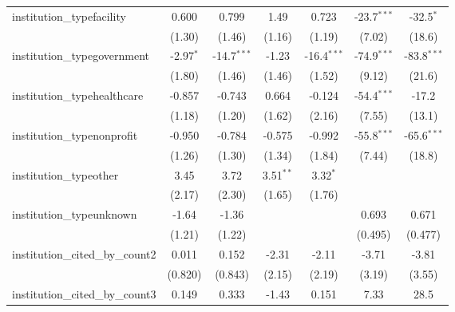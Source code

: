 \begin{tabular}{lcccccc}
   institution\_typefacility             & 0.600         & 0.799         & 1.49          & 0.723         & -23.7$^{***}$ & -32.5$^{*}$\\   
                                         & (1.30)        & (1.46)        & (1.16)        & (1.19)        & (7.02)        & (18.6)\\   
   institution\_typegovernment           & -2.97$^{*}$   & -14.7$^{***}$ & -1.23         & -16.4$^{***}$ & -74.9$^{***}$ & -83.8$^{***}$\\   
                                         & (1.80)        & (1.46)        & (1.46)        & (1.52)        & (9.12)        & (21.6)\\   
   institution\_typehealthcare           & -0.857        & -0.743        & 0.664         & -0.124        & -54.4$^{***}$ & -17.2\\   
                                         & (1.18)        & (1.20)        & (1.62)        & (2.16)        & (7.55)        & (13.1)\\   
   institution\_typenonprofit            & -0.950        & -0.784        & -0.575        & -0.992        & -55.8$^{***}$ & -65.6$^{***}$\\   
                                         & (1.26)        & (1.30)        & (1.34)        & (1.84)        & (7.44)        & (18.8)\\   
   institution\_typeother                & 3.45          & 3.72          & 3.51$^{**}$   & 3.32$^{*}$    &               &   \\   
                                         & (2.17)        & (2.30)        & (1.65)        & (1.76)        &               &   \\   
   institution\_typeunknown              & -1.64         & -1.36         &               &               & 0.693         & 0.671\\   
                                         & (1.21)        & (1.22)        &               &               & (0.495)       & (0.477)\\   
   institution\_cited\_by\_count2        & 0.011         & 0.152         & -2.31         & -2.11         & -3.71         & -3.81\\   
                                         & (0.820)       & (0.843)       & (2.15)        & (2.19)        & (3.19)        & (3.55)\\   
   institution\_cited\_by\_count3        & 0.149         & 0.333         & -1.43         & 0.151         & 7.33          & 28.5\\   

\end{tabular}
